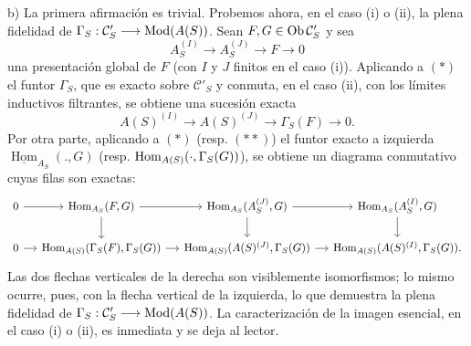 b) La primera afirmación es trivial. Probemos ahora, en el caso (i) o (ii), la plena fidelidad de $\Gamma_S:\mathcal C'_S\longrightarrow\Mod(A(S))$. Sean $F,G\in\Ob\mathcal C'_S$ y sea
\[
A_S^{(I)}\longrightarrow A_S^{(J)}\longrightarrow F\longrightarrow0
\tag{$*$}
\]
una presentación global de $F$ (con $I$ y $J$ finitos en el caso (i)). Aplicando a $(*)$ el funtor $\Gamma_S$, que es exacto sobre $\mathcal C'_S$ y conmuta, en el caso (ii), con los límites inductivos filtrantes, se obtiene una sucesión exacta
\[
A(S)^{(I)}\longrightarrow A(S)^{(J)}\longrightarrow\Gamma_S(F)\longrightarrow0.
\tag{$**$}
\]
Por otra parte, aplicando a $(*)$ (resp. $(**)$) el funtor exacto a izquierda $\underline{\operatorname{Hom}}_{A_S}(.,G)$ (resp. $\operatorname{Hom}_{A(S)}(\cdot,\Gamma_S(\sisi{F}{G}))$), se obtiene un diagrama conmutativo cuyas filas son exactas:
\[
\begin{tikzcd}[column sep=small]
0 \arrow[r] & \operatorname{Hom}_{A_S}(F,G) \arrow[r] \arrow[d] &
\operatorname{Hom}_{A_S}(A_S^{(J)},G) \arrow[r] \arrow[d] &
\operatorname{Hom}_{A_S}(A_S^{(I)},G) \arrow[d] \\
0 \arrow[r] & \sisi{\operatorname{Hom}_{A(S)}(F,G)}{\operatorname{Hom}_{A(S)}(\Gamma_S(F),\Gamma_S(G))} \arrow[r] &
\operatorname{Hom}_{A(S)}(A(S)^{(J)},\Gamma_S(G)) \arrow[r] &
\operatorname{Hom}_{A(S)}(A(S)^{(I)},\Gamma_S(G)).
\end{tikzcd}
\]
Las dos flechas verticales de la derecha son visiblemente isomorfismos; lo mismo ocurre, pues, con la flecha vertical de la izquierda, lo que demuestra la plena fidelidad de $\Gamma_S:\mathcal C'_S\longrightarrow\Mod(A(S))$. La caracterización de la imagen esencial, en el caso (i) o (ii), es inmediata y se deja al lector.

